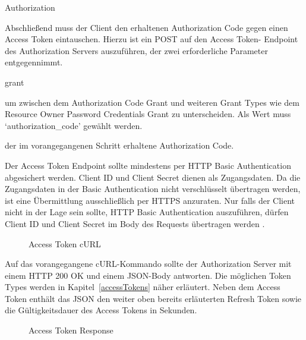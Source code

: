 \begin{labeling}{Authorization}
    \item [Access Token Retrieval (7--8)]
    Abschließend muss der Client den erhaltenen Authorization Code gegen
    einen Access Token eintauschen. Hierzu ist ein POST auf den Access Token-
    Endpoint des Authorization Servers auszuführen, der zwei erforderliche
    Parameter entgegennimmt.

    \begin{labeling}{grant}
        \item [grant\_type] um zwischen dem Authorization Code Grant und
        weiteren Grant Types wie dem Resource Owner Password Credentials Grant
        zu unterscheiden. Als Wert muss `authorization\_code' gewählt werden.
        \item [code] der im vorangegangenen Schritt erhaltene Authorization
        Code.
    \end{labeling}
    Der Access Token Endpoint sollte mindestens per HTTP Basic Authentication
    abgesichert werden. Client ID und Client Secret dienen als Zugangsdaten.
    Da die Zugangsdaten in der Basic Authentication nicht verschlüsselt
    übertragen werden, ist eine Übermittlung ausschließlich per HTTPS anzuraten.
    Nur falls der Client nicht in der Lage sein sollte, HTTP Basic Authentication
    auszuführen, dürfen Client ID und Client Secret im Body des Requests
    übertragen werden .

    \begin{figure}[h]
        \scalebox{.8}{
            
        }
        \caption{Access Token cURL}\label{ls: Access Token cURL}
    \end{figure}

    Auf das vorangegangene cURL-Kommando sollte der Authorization Server mit
    einem HTTP 200 OK und einem JSON-Body antworten. Die möglichen Token Types
    werden in Kapitel~\ref{accessTokens} näher erläutert. Neben dem Access Token
    enthält das JSON den weiter oben bereits erläuterten Refresh Token sowie die
    Gültigkeitsdauer des Access Tokens in Sekunden.

    \begin{figure}[h]
        \scalebox{.8}{
            
        }
        \caption{Access Token Response}\label{ls: Access Token Response}
    \end{figure}

\end{labeling}

